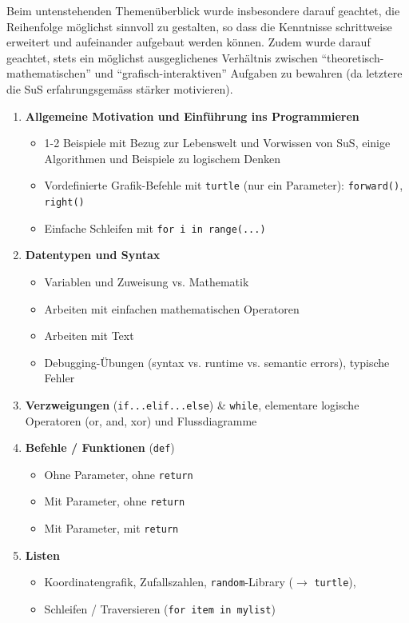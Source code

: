 Beim untenstehenden Themenüberblick wurde insbesondere darauf geachtet, die Reihenfolge möglichst sinnvoll zu gestalten, so dass die Kenntnisse schrittweise erweitert und aufeinander aufgebaut werden können. Zudem wurde darauf geachtet, stets ein möglichst ausgeglichenes Verhältnis zwischen ``theoretisch-mathematischen'' und ``grafisch-interaktiven'' Aufgaben zu bewahren (da letztere die SuS erfahrungsgemäss stärker motivieren).

\begin{overviewBox}[title=Überblick der Themen]
    \begin{enumerate}
    \item \textbf{Allgemeine Motivation und Einführung ins Programmieren}
    \begin{itemize}
        \item 1-2 Beispiele mit Bezug zur Lebenswelt und Vorwissen von SuS, einige Algorithmen und Beispiele zu logischem Denken
        \item Vordefinierte Grafik-Befehle mit \lstinline|turtle| (nur ein Parameter): \lstinline|forward()|, \lstinline|right()|
        \item Einfache Schleifen mit \lstinline|for i in range(...)|
    \end{itemize}
    \item \textbf{Datentypen und Syntax}
    \begin{itemize}
        \item Variablen und Zuweisung vs. Mathematik
        \item Arbeiten mit einfachen mathematischen Operatoren
        \item Arbeiten mit Text
        \item Debugging-Übungen (syntax vs. runtime vs. semantic errors), typische Fehler
    \end{itemize}
    \item \textbf{Verzweigungen} (\lstinline|if...elif...else|) \& \lstinline|while|,  elementare logische Operatoren (or, and, xor)  und Flussdiagramme
    \item \textbf{Befehle / Funktionen} (\lstinline|def|)
    \begin{itemize}
        \item Ohne Parameter, ohne \lstinline|return|
        \item Mit Parameter, ohne \lstinline|return|
        \item Mit Parameter, mit \lstinline|return|
    \end{itemize}
    \item \textbf{Listen}
    \begin{itemize}
        \item  Koordinatengrafik, Zufallszahlen, \lstinline|random|-Library ($\rightarrow$ \lstinline|turtle|), \item Schleifen / Traversieren (\lstinline|for item in mylist|)
    \end{itemize}
\end{enumerate}
\end{overviewBox}


